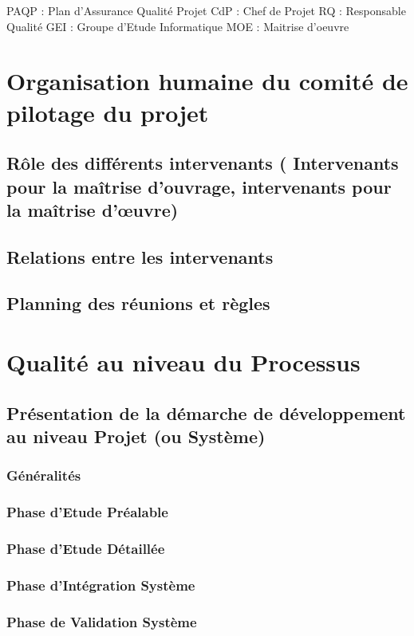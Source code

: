 PAQP : Plan d’Assurance Qualité Projet
CdP : Chef de Projet       
RQ : Responsable Qualité       
GEI : Groupe d'Etude Informatique       
MOE : Maitrise d'oeuvre
                                                                      
\section{Organisation humaine du comité de pilotage du projet}
\subsection{Rôle des différents intervenants ( Intervenants pour la maîtrise d’ouvrage, intervenants pour la maîtrise d’œuvre)}
\subsection{Relations entre les intervenants}
\subsection{Planning des réunions et règles}

\section{Qualité au niveau du Processus}
\subsection{Présentation de la démarche de développement au niveau Projet (ou Système)}
\subsubsection{Généralités              }
\subsubsection{Phase d’Etude Préalable }
\subsubsection{Phase d’Etude Détaillée}
\subsubsection{Phase d’Intégration Système }
\subsubsection{Phase de Validation Système}
